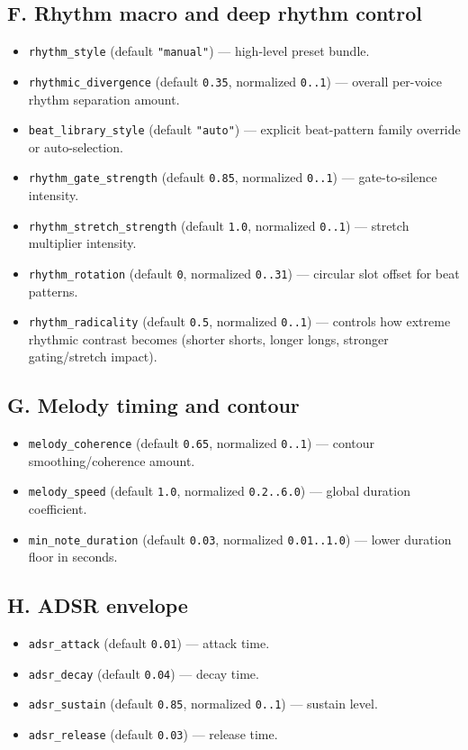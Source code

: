\documentclass[11pt,a4paper]{article}
\begin{document}
\subsection*{F. Rhythm macro and deep rhythm control}
\begin{itemize}
  \item \texttt{rhythm\_style} (default \texttt{"manual"}) --- high-level preset bundle.
  \item \texttt{rhythmic\_divergence} (default \texttt{0.35}, normalized \texttt{0..1}) --- overall per-voice rhythm separation amount.
  \item \texttt{beat\_library\_style} (default \texttt{"auto"}) --- explicit beat-pattern family override or auto-selection.
  \item \texttt{rhythm\_gate\_strength} (default \texttt{0.85}, normalized \texttt{0..1}) --- gate-to-silence intensity.
  \item \texttt{rhythm\_stretch\_strength} (default \texttt{1.0}, normalized \texttt{0..1}) --- stretch multiplier intensity.
  \item \texttt{rhythm\_rotation} (default \texttt{0}, normalized \texttt{0..31}) --- circular slot offset for beat patterns.
  \item \texttt{rhythm\_radicality} (default \texttt{0.5}, normalized \texttt{0..1}) --- controls how extreme rhythmic contrast becomes (shorter shorts, longer longs, stronger gating/stretch impact).
\end{itemize}

\subsection*{G. Melody timing and contour}
\begin{itemize}
  \item \texttt{melody\_coherence} (default \texttt{0.65}, normalized \texttt{0..1}) --- contour smoothing/coherence amount.
  \item \texttt{melody\_speed} (default \texttt{1.0}, normalized \texttt{0.2..6.0}) --- global duration coefficient.
  \item \texttt{min\_note\_duration} (default \texttt{0.03}, normalized \texttt{0.01..1.0}) --- lower duration floor in seconds.
\end{itemize}

\subsection*{H. ADSR envelope}
\begin{itemize}
  \item \texttt{adsr\_attack} (default \texttt{0.01}) --- attack time.
  \item \texttt{adsr\_decay} (default \texttt{0.04}) --- decay time.
  \item \texttt{adsr\_sustain} (default \texttt{0.85}, normalized \texttt{0..1}) --- sustain level.
  \item \texttt{adsr\_release} (default \texttt{0.03}) --- release time.
\end{itemize}
\end{document}
